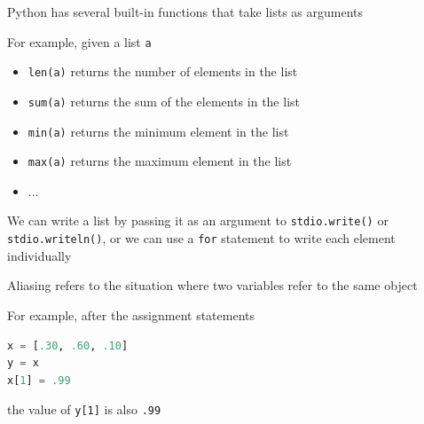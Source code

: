 \documentclass[8pt,a4paper,compress]{beamer}
\begin{document}
\begin{frame}[fragile]
\pause

Python has several built-in functions that take lists as arguments

\pause
\bigskip

For example, given a list \lstinline{a}
\begin{itemize}
\item \lstinline{len(a)} returns the number of elements in the list
\item \lstinline{sum(a)} returns the sum of the elements in the list
\item \lstinline{min(a)} returns the minimum element in the list
\item \lstinline{max(a)} returns the maximum element in the list
\item ...
\end{itemize}

\pause
\bigskip

We can write a list by passing it as an argument to \lstinline{stdio.write()} or \lstinline{stdio.writeln()}, or we can use a \lstinline{for} statement to write each element individually

\pause
\bigskip

Aliasing refers to the situation where two variables refer to the same object

\pause
\bigskip

For example, after the assignment statements
\begin{lstlisting}[language=Python]
x = [.30, .60, .10]
y = x
x[1] = .99
\end{lstlisting}
the value of \lstinline{y[1]} is also \lstinline{.99}
\end{frame}
\end{document}
